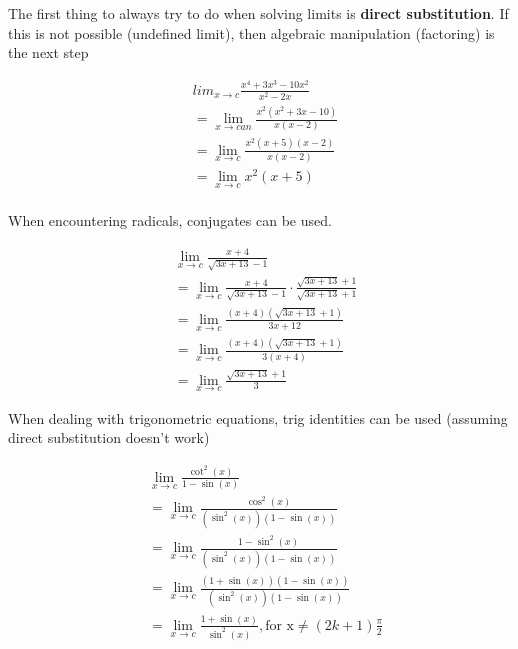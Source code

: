 \documentclass[12pt]{article}
\begin{document}
        The first thing to always try to do when solving limits is \textbf{direct substitution}. If this
        is not possible (undefined limit), then algebraic manipulation (factoring) is the next step

        \[
            \begin{aligned}
                & lim_{x \to c} \frac{x^4 + 3x^3 - 10x^2}{x^2 - 2x} \\
                &= \lim_{x \to can} \frac{x^2(x^2 + 3x - 10)}{x(x - 2)} \\
                &= \lim_{x \to c} \frac{x^2(x+5)(x-2)}{x(x-2)}\\
                &= \lim_{x \to c} x^2(x+5)\\
            \end{aligned}    
        \]

        When encountering radicals, conjugates can be used.

        \[
            \begin{aligned}
                & \lim_{x \to c} \frac{x + 4}{\sqrt{3x + 13} - 1} \\
                &= \lim_{x \to c} \frac{x + 4}{\sqrt{3x + 13} - 1} \cdot \frac{\sqrt{3x + 13} + 1}{\sqrt{3x + 13} + 1} \\
                &= \lim_{x \to c} \frac{(x + 4)(\sqrt{3x + 13} + 1)}{3x + 12} \\
                &= \lim_{x \to c} \frac{(x + 4)(\sqrt{3x + 13} + 1)}{3(x + 4)} \\
                &= \lim_{x \to c} \frac{\sqrt{3x + 13} + 1}{3}
            \end{aligned}    
        \]

        When dealing with trigonometric equations, trig identities can be used
        (assuming direct substitution doesn't work)

        \[
            \begin{aligned}
                &\lim_{x \to c} \frac{\cot^2(x)}{1 - \sin(x)} \\
                &= \lim_{x \to c} \frac{\cos^2(x)}{(\sin^2(x))(1 - \sin(x))} \\
                &= \lim_{x \to c} \frac{1 - \sin^2(x)}{(\sin^2(x))(1 - \sin(x))} \\
                &= \lim_{x \to c} \frac{(1 + \sin(x))(1 - \sin(x))}{(\sin^2(x))(1 - \sin(x))} \\
                &= \lim_{x \to c} \frac{1 + \sin(x)}{\sin^2(x)}, \text{for x} \ne (2k + 1)\frac{\pi}{2}
            \end{aligned}    
        \]
\end{document}
